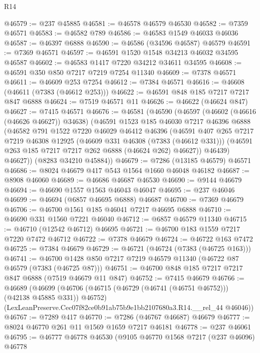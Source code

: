 \begin{lexlean}{R14}
\begin{coremodule}
@46579 := @237 @45885
@46581 := @46578 @46579 @46530
@46582 := @7359 @46571
@46583 := @46582 @789
@46586 := @46583 @1549 @46033 @46036
@46587 := @46397 @6888
@46590 := @46586 (@34596 @46587) @46579
@46591 := @7369 @46571
@46597 := @46591 @1520 @1548 @34213 @46032 @34595 @46587
@46602 := @46583 @1417 @7220 @34212 @34611 @34595
@46608 := @46591 @350 @850 @7217 @7219 @7254 @11340
@46609 := @7378 @46571
@46611 := @46609 @253 @7254
@46612 := @7384 @46571
@46616 := @46608 (@46611 (@7383 (@46612 @253)))
@46622 := @46591 @848 @185 @7217 @7217 @847 @6888
@46624 := @7519 @46571 @11
@46626 := @46622 (@46624 @847)
@46627 := @7415 @46571
@46676 := @46581
    (@46590
      (@46597
        (@46602 (@46616 (@46626 @46627)) @34638)
        (@46591
          @1523
          @185
          @46030
          @7217
          @46396
          @6888
          (@46582
            @791
            @1522
            @7220
            @46029
            @46412
            @46396
            (@46591
              @407
              @265
              @7217
              @7219
              @46308
              @12925
              (@46609 @331 @46308 (@7383 (@46612 @331)))
              (@46591 @263 @185 @7217 @7217 @262 @6888 (@46624 @262) @46627))
            @46439)
          @46627))
      (@8283 @34210 @45884))
@46679 := @7286 (@13185 @46579) @46571
@46686 := @8024 @46679 @417 @543 @1564 @1660 @46048 @46182
@46687 := @8908 @46060
@46689 := @46686 @46687 @46530
@46690 := @9144 @46679
@46694 := @46690 @1557 @1563 @46043 @46047
@46695 := @237 @46046
@46699 := @46694 (@6857 @46695 @6888) @46687
@46700 := @7369 @46679
@46706 := @46700 @1561 @185 @46041 @7217 @46695 @6888
@46710 := @46690 @331 @1560 @7221 @46040
@46712 := @6857 @46579 @11340
@46715 := @46710 (@12542 @46712) @46695
@46721 := @46700 @183 @1559 @7217 @7220 @7472 @46712
@46722 := @7378 @46679
@46724 := @46722 @163 @7472
@46725 := @7384 @46679
@46729 := @46721 (@46724 (@7383 (@46725 @163)))
@46741 := @46700 @1428 @850 @7217 @7219 @46579 @11340 (@46722 @87 @46579 (@7383 (@46725 @87)))
@46751 := @46700 @848 @185 @7217 @7217 @847 @6888 (@7519 @46679 @11 @847)
@46752 := @7415 @46679
@46766 := @46689
    (@46699
      (@46706 (@46715 (@46729 (@46741 (@46751 @46752))) (@42138 @45885 @331)) @46752)
      (LexLeanPreserve.Cec07f82ce0b91ab75b9e1bb2107680a3.R14.__rel_44 @46046))
@46767 := @7289 @417
@46770 := @7286 (@46767 @46687) @46679
@46777 := @8024 @46770 @261 @11 @1569 @1659 @7217 @46181
@46778 := @237 @46061
@46795 := @46777
    @46778
    @46530
    (@9105
      @46770
      @1568
      @7217
      (@237 @46096)
      @46778

\end{coremodule}
\end{lexlean}

